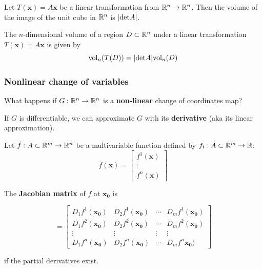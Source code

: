\begin{corollary}
Let $T(\bm{x}) = A\bm{x}$ be a linear transformation from $\mathbb{R}^n \to \mathbb{R}^n$.  Then the volume of the image of the unit cube in $\mathbb{R}^n$ is $|\textnormal{det}A|$.


\end{corollary}
    
    \begin{theorem}
    The $n$-dimensional volume of a region $D \subset \mathbb{R}^n$ under a linear transformation $T(\bm{x}) = A\bm{x}$ is given by 
    $$\textnormal{vol}_n(T(D)) = |\textnormal{det}A|\textnormal{vol}_n(D)$$
    \end{theorem}



\subsubsection{Nonlinear change of variables}

\begin{motivating}
     What happens if $G : \mathbb{R}^n \to \mathbb{R}^n$ is a \textbf{non-linear} change of coordinates map?
\end{motivating}

If $G$ is differentiable, we can approximate $G$ with its \textbf{derivative} (aka its linear approximation).

\begin{definition}
    Let $f : A \subset \mathbb{R}^m \to \mathbb{R}^n$ be a multivariable function defined by $f_i  : A \subset \mathbb{R}^m \to \mathbb{R}$:
    \begin{equation*}
        f(\bm{x}) = \begin{bmatrix}
f^1(\bm{x}) \\
\vdots \\
f^n(\bm{x})
\end{bmatrix}
    \end{equation*}
    
    The \textbf{Jacobian matrix} of $f$ at $\bm{x_0}$ is 
    
    \begin{equation*}
        [J_f(\bm{x_0})] = \begin{bmatrix}
D_1f^1(\bm{x_0}) & D_2f^1(\bm{x_0}) & \cdots & D_mf^1(\bm{x_0}) \\
D_1f^2(\bm{x_0}) & D_2f^2(\bm{x_0}) & \cdots & D_mf^2(\bm{x_0}) \\
\vdots & \vdots & \vdots & \vdots\\
D_1f^n(\bm{x_0}) & D_2f^n(\bm{x_0}) & \cdots & D_mf^n\bm{x_0}) 
\end{bmatrix}
    \end{equation*}
    
    if the partial derivatives exist.
    
    \end{definition}


